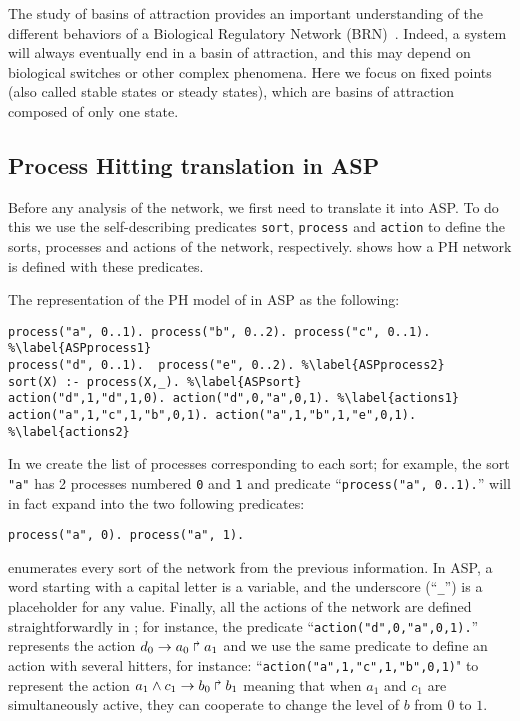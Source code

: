 
The study of basins of attraction provides an important understanding of the different behaviors of a Biological Regulatory Network (BRN)~\cite{wuensche1998genomic}.
Indeed, a system will always eventually end in a basin of attraction,
and this may depend on biological switches or other complex phenomena.
Here we focus on fixed points (also called stable states or steady states),
which are basins of attraction composed of only one state.

\subsection{Process Hitting translation in ASP}
Before any analysis of the network,
we first need to translate it into ASP\benchmarksfootnote.
To do this we use the self-describing predicates
\texttt{sort}, \texttt{process} and \texttt{action} to define the sorts, processes and actions of the network, respectively.
 shows how a PH network is defined with these predicates.

\begin{example}
\label{ex:asp-ph}
The representation of the PH model of  in ASP as the following:
\begin{lstlisting}
process("a", 0..1). process("b", 0..2). process("c", 0..1). %\label{ASPprocess1}
process("d", 0..1).  process("e", 0..2). %\label{ASPprocess2}
sort(X) :- process(X,_). %\label{ASPsort}
action("d",1,"d",1,0). action("d",0,"a",0,1). %\label{actions1}
action("a",1,"c",1,"b",0,1). action("a",1,"b",1,"e",0,1). %\label{actions2}
\end{lstlisting}
In  we create the list of processes corresponding to each sort;
for example, the sort \texttt{"a"} has 2 processes numbered \texttt{0} and \texttt{1} and
predicate ``\texttt{process("a", 0..1).}'' will in fact expand into the two following predicates:
\begin{lstlisting}[numbers=none]
process("a", 0). process("a", 1).
\end{lstlisting}
 enumerates every sort of the network from the previous information.
In ASP, a word starting with a capital letter is a variable,
and the underscore (``\texttt{\_}'') is a placeholder for any value.
Finally, all the actions of the network are defined straightforwardly in ;
for instance, the predicate ``\texttt{action("d",0,"a",0,1).}'' represents the action
$d_0\rightarrow a_0\Rsh a_1$ and we use the same predicate to define an action with several hitters, for instance: ``\texttt{action("a",1,"c",1,"b",0,1)}" to represent the action $a_1 \wedge c_1\rightarrow b_0\Rsh b_1$ meaning that when $a_1$ and $c_1$ are simultaneously active, they can cooperate to change the level of $b$ from $0$ to $1$.
\end{example}

